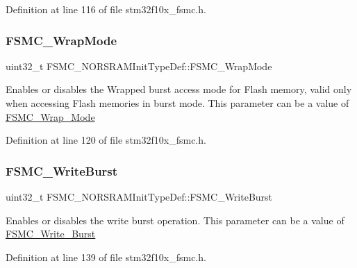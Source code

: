 Definition at line 116 of file stm32f10x\+\_\+fsmc.\+h.

\mbox{\label{struct_f_s_m_c___n_o_r_s_r_a_m_init_type_def_a7e201c17bf7c5f6cc69fb6de29c8b024}} 
\subsubsection{\texorpdfstring{F\+S\+M\+C\+\_\+\+Wrap\+Mode}{FSMC\_WrapMode}}
{\footnotesize\ttfamily uint32\+\_\+t F\+S\+M\+C\+\_\+\+N\+O\+R\+S\+R\+A\+M\+Init\+Type\+Def\+::\+F\+S\+M\+C\+\_\+\+Wrap\+Mode}

Enables or disables the Wrapped burst access mode for Flash memory, valid only when accessing Flash memories in burst mode. This parameter can be a value of \hyperlink{group___f_s_m_c___wrap___mode}{F\+S\+M\+C\+\_\+\+Wrap\+\_\+\+Mode} 

Definition at line 120 of file stm32f10x\+\_\+fsmc.\+h.

\mbox{\label{struct_f_s_m_c___n_o_r_s_r_a_m_init_type_def_adac3756711f2d76e56a8cbcb7a03843d}} 
\subsubsection{\texorpdfstring{F\+S\+M\+C\+\_\+\+Write\+Burst}{FSMC\_WriteBurst}}
{\footnotesize\ttfamily uint32\+\_\+t F\+S\+M\+C\+\_\+\+N\+O\+R\+S\+R\+A\+M\+Init\+Type\+Def\+::\+F\+S\+M\+C\+\_\+\+Write\+Burst}

Enables or disables the write burst operation. This parameter can be a value of \hyperlink{group___f_s_m_c___write___burst}{F\+S\+M\+C\+\_\+\+Write\+\_\+\+Burst} 

Definition at line 139 of file stm32f10x\+\_\+fsmc.\+h.

